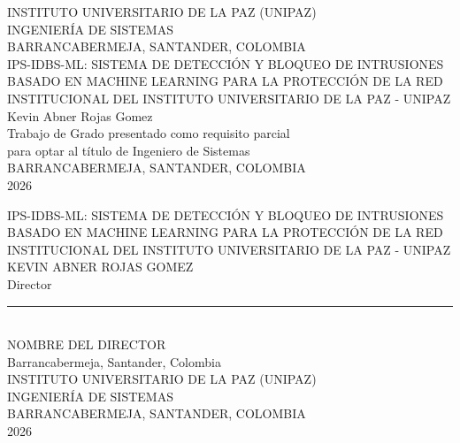 \documentclass[12pt,letterpaper]{report}
\newcommand{\titulo}{IPS-IDBS-ML: Sistema de Detección y Bloqueo de Intrusiones basado en Machine Learning para la protección de la red institucional del Instituto Universitario de la Paz - UNIPAZ}
\newcommand{\autor}{Kevin Abner Rojas Gomez}
\newcommand{\institucion}{Instituto Universitario de la Paz (UNIPAZ)}
\newcommand{\programa}{Ingeniería de Sistemas}
\newcommand{\ciudad}{Barrancabermeja, Santander, Colombia}
\newcommand{\anno}{2026}
\begin{document}
\begin{titlepage}
  \begin{center}
    \vspace*{2cm}
    \MakeUppercase{\institucion}\\[0.5cm]
    \MakeUppercase{\programa}\\[0.5cm]
    \MakeUppercase{\ciudad}\\[2cm]
    
    \MakeUppercase{\titulo}\\[2cm]
    
    \autor\\[2cm]
    
    Trabajo de Grado presentado como requisito parcial\\[0.3cm]
    para optar al título de Ingeniero de Sistemas\\[2cm]
    
    \MakeUppercase{\ciudad}\\[0.3cm]
    \MakeUppercase{\anno}
  \end{center}
\end{titlepage}

\begin{titlepage}
  \begin{center}
    \vspace*{2cm}
    \MakeUppercase{\titulo}\\[2cm]
    
    \MakeUppercase{\autor}\\[2cm]
    
    Director\\[0.3cm]
    \rule{6cm}{0.5pt}\\[0.3cm]
    \MakeUppercase{Nombre del Director}\\
    \ciudad\\[2cm]
    
    \MakeUppercase{\institucion}\\[0.3cm]
    \MakeUppercase{\programa}\\[0.3cm]
    \MakeUppercase{\ciudad}\\[0.3cm]
    \MakeUppercase{\anno}
  \end{center}
\end{titlepage}
\end{document}
